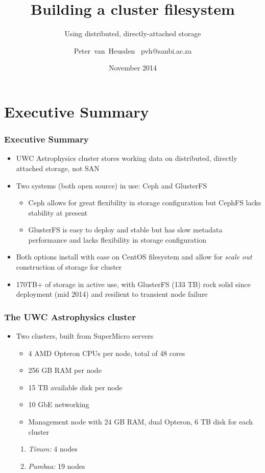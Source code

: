 \documentclass[handout]{beamer}
\title{Building a cluster filesystem}
\subtitle{Using distributed, directly-attached storage}
\author{\texorpdfstring{Peter~van~Heusden\newline
~pvh@sanbi.ac.za}{Peter~van~Heusden}}
\institute[UWC]
{
Information and Communication Services\\
University of the Western Cape\\
Bellville, South Africa\\
\insertlogo}
\date{November 2014}
\begin{document}
\begin{frame}
\logo{}
\titlepage
\end{frame}

\section{Executive Summary}
\begin{frame}
\frametitle{Executive Summary}
\begin{itemize}
\item UWC Astrophysics cluster stores working data on distributed, directly attached storage, not SAN
\pause
\item Two systems (both open source) in use: Ceph and GlusterFS
\pause
\begin{itemize}
\item Ceph allows for great flexibility in storage configuration but CephFS lacks stability at present
\pause
\item GlusterFS is easy to deploy and stable but has slow metadata performance and lacks flexibility in storage configuration
\end{itemize}
\pause
\item Both options install with ease on CentOS filesystem and allow for \emph{scale out} construction of storage for cluster
\pause
\item 170TB+ of storage in active use, with GlusterFS (133 TB) rock solid since deployment (mid 2014) and resilient to transient node failure
\end{itemize}
\end{frame}

\begin{frame}
\frametitle{The UWC Astrophysics cluster}
\begin{itemize}
 \item Two clusters, built from SuperMicro servers
 \begin{itemize}
 \item 4 AMD Opteron CPUs per node, total of 48 cores
 \item 256 GB RAM per node
 \item 15 TB available disk per node
 \item 10 GbE networking
 \item Management node with 24 GB RAM, dual Opteron, 6 TB disk for each cluster
 \end{itemize}
 \begin{enumerate}
 \pause
 \item \emph{Timon:} 4 nodes
 \pause
 \item \emph{Pumbaa:} 19 nodes
 \end{enumerate}
\end{itemize}
\end{frame}
\end{document}
